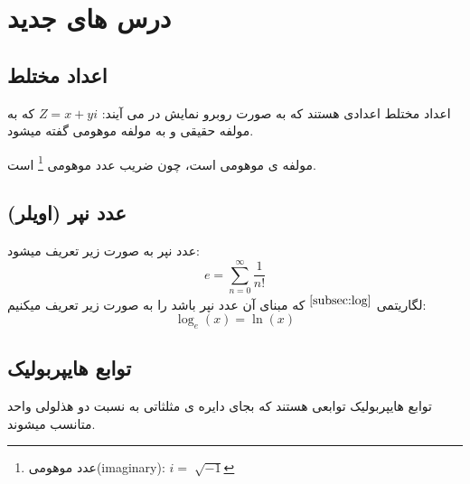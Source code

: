 \documentclass[12pt, a4paper, oneside]{article}
\begin{document}
\section{درس های جدید}
\subsection{اعداد مختلط}
اعداد مختلط اعدادی هستند که به صورت روبرو نمایش در می آیند: $Z = x + yi$
که به  مولفه حقیقی و به  مولفه موهومی گفته میشود.

 مولفه ی موهومی است، چون ضریب عدد موهومی \footnote[2]{عدد موهومی(imaginary): $i=\sqrt[]{-1}$} است.
\subsection{عدد نپر (اویلر)}
عدد نپر به صورت زیر تعریف میشود:
\[e=\sum_{n=0}^{\infty} \frac{1}{n!}\]
لگاریتمی
{$\overset{\ref{subsec:log}}{}$}
 که مبنای آن عدد نپر باشد را به صورت زیر تعریف میکنیم: 
\[\log_e (x) = \ln (x)\]
\subsection{توابع هایپربولیک}
توابع هایپربولیک توابعی هستند که بجای دایره ی مثلثاتی به نسبت دو هذلولی واحد متانسب میشوند.
\end{document}
